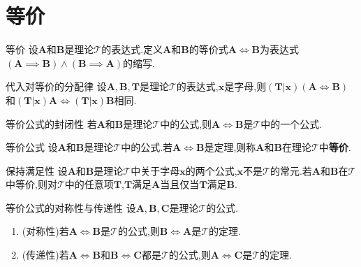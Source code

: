 \section{等价}

\begin{definition}{等价}{}
	设$\boldsymbol{A}$和$\boldsymbol{B}$是理论$\mathcal{T}$的表达式.定义$\boldsymbol{A}$和$\boldsymbol{B}$的等价式$\boldsymbol{A}\iff\boldsymbol{B}$为表达式$\left(\boldsymbol{A}\implies\boldsymbol{B}\right)\wedge\left(\boldsymbol{B}\implies\boldsymbol{A}\right)$的缩写.
\end{definition}

\begin{metatheorem}{代入对等价的分配律}{}
	设$\boldsymbol{A},\boldsymbol{B},\boldsymbol{T}$是理论$\mathcal{T}$的表达式,$\boldsymbol{x}$是字母,则$\left(\boldsymbol{T}|\boldsymbol{x}\right)\left(\boldsymbol{A}\iff\boldsymbol{B}\right)$和$\left(\boldsymbol{T}|\boldsymbol{x}\right)\boldsymbol{A}\iff\left(\boldsymbol{T}|\boldsymbol{x}\right)\boldsymbol{B}$相同.
\end{metatheorem}

\begin{metatheorem}{等价公式的封闭性}{}
	若$\boldsymbol{A}$和$\boldsymbol{B}$是理论$\mathcal{T}$中的公式,则$\boldsymbol{A}\iff\boldsymbol{B}$是$\mathcal{T}$中的一个公式.
\end{metatheorem}

\begin{definition}{等价公式}{}
	设$\boldsymbol{A}$和$\boldsymbol{B}$是理论$\mathcal{T}$中的公式.若$\boldsymbol{A}\iff\boldsymbol{B}$是定理,则称$\boldsymbol{A}$和$\boldsymbol{B}$在理论$\mathcal{T}$中\textbf{等价}.
\end{definition}

\begin{corollary}{保持满足性}{}
	设$\boldsymbol{A}$和$\boldsymbol{B}$是理论$\mathcal{T}$中关于字母$\boldsymbol{x}$的两个公式,$\boldsymbol{x}$不是$\mathcal{T}$的常元.若$\boldsymbol{A}$和$\boldsymbol{B}$在$\mathcal{T}$中等价,则对$\mathcal{T}$中的任意项$\boldsymbol{T}$,$\boldsymbol{T}$满足$\boldsymbol{A}$当且仅当$\boldsymbol{T}$满足$\boldsymbol{B}$.
\end{corollary}

\begin{metatheorem}{等价公式的对称性与传递性}{}
	设$\boldsymbol{A},\boldsymbol{B},\boldsymbol{C}$是理论$\mathcal{T}$的公式.
	\begin{enumerate}
		\item (对称性)若$\boldsymbol{A}\iff\boldsymbol{B}$是$\mathcal{T}$的公式,则$\boldsymbol{B}\iff\boldsymbol{A}$是$\mathcal{T}$的定理.
		\item (传递性)若$\boldsymbol{A}\iff\boldsymbol{B}$和$\boldsymbol{B}\iff\boldsymbol{C}$都是$\mathcal{T}$的公式,则$\boldsymbol{A}\iff\boldsymbol{C}$是$\mathcal{T}$的定理.
	\end{enumerate}
\end{metatheorem}

